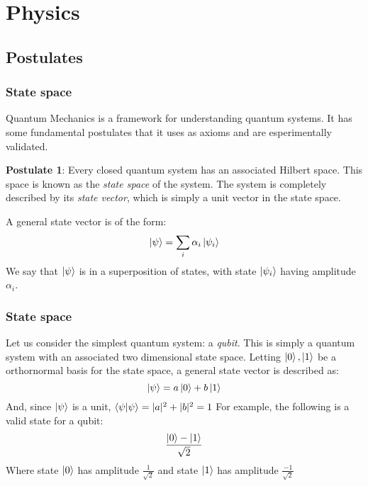\documentclass{beamer}
\begin{document}
    \section{Physics}
    \subsection{Postulates}
    \begin{frame}
        \frametitle{State space}
        Quantum Mechanics is a framework for understanding quantum systems. 
        It has some fundamental postulates that it uses as axioms and are esperimentally validated.
        \begin{definition}
            \textbf{Postulate 1}: Every closed quantum system has an associated Hilbert space. 
            This space is known as the \textit{state space} of the system. The system is completely described by its
            \textit{state vector}, which is simply a unit vector in the state space.
        \end{definition}
        A general state vector is of the form:
        \begin{equation}
            \ket{\psi} = \sum_i \alpha_i \ket{\psi_i}
        \end{equation}
        We say that $\ket{\psi}$ is in a superposition of states, with state $\ket{\psi_i}$ having amplitude $\alpha_i$.
    \end{frame}
    \begin{frame}
        \frametitle{State space}
        \begin{example}
            Let us consider the simplest quantum system: a \textit{qubit}. 
            This is simply a quantum system with an associated two dimensional state space.
            Letting $\ket{0}, \ket{1}$ be a orthornormal basis for the state space, a general state vector 
            is described as:
            \begin{equation}
                \ket{\psi} = a \ket{0} + b \ket{1}
            \end{equation}
            And, since $\ket{\psi}$ is a unit, $\braket{\psi|\psi} = |a|^2 + |b|^2 = 1$
            For example, the following is a valid state for a qubit:
            \begin{equation}
                \frac{\ket{0} - \ket{1}}{\sqrt{2}}
            \end{equation}
            Where state $\ket{0}$ has amplitude $\frac{1}{\sqrt{2}}$ and state $\ket{1}$ has amplitude $\frac{-1}{\sqrt{2}}$ 
        \end{example}
    \end{frame}
\end{document}
